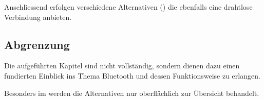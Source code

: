 Anschliessend erfolgen verschiedene Alternativen () die ebenfalls eine drahtlose Verbindung anbieten.

\subsection{Abgrenzung}
Die aufgeführten Kapitel sind nicht vollständig, sondern dienen dazu einen fundierten Einblick ins Thema Bluetooth und dessen Funktionsweise zu erlangen.

Besonders im  werden die Alternativen nur oberflächlich zur Übersicht behandelt.
